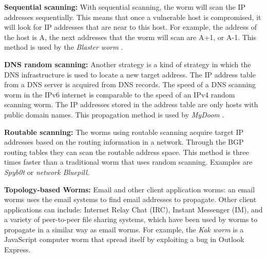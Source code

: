 \begin{description}
\item \textbf{Sequential scanning:}
With sequential scanning, the worm will scan the IP addresses sequentially. This means that once a vulnerable host is compromised, it will look for IP addresses that are near to this host. For example, the address of the host is A, the next addresses that the worm will scan are A+1, or A-1. This method is used by the \textit{Blaster worm} \citep{zou2006performance}.


\item \textbf{DNS random scanning:} Another strategy is a kind of strategy in which the DNS infrastructure is used to locate a new target address. The IP address table from a DNS server is acquired from DNS records. 
The speed of a DNS scanning worm in the IPv6 internet is comparable to the speed of an IPv4 random scanning worm. 
The IP addresses stored in the address table are only hosts with public domain names. This propagation method is used by \textit{MyDoom} \citep{kamra2005effect}.

\item \textbf{Routable scanning:} The worms using routable scanning acquire target IP addresses based on the routing information in a network. Through  the BGP routing tables they can scan the routable address space. This method is three times faster than a traditional worm that uses random scanning. Examples are \textit{Spyb0t} or \textit{network Bluepill}. 

\item \textbf{Topology-based Worms:} Email and other client application worms: an email worms uses the email systems to find email addresses to propagate. Other client applications can include: Internet Relay Chat (IRC), Instant Messenger (IM), and a variety of peer-to-peer
file sharing systems, which have been used by worms to propagate in a similar way as email worms. For example, the \textit{Kak worm} \citep{Kakworm} is a JavaScript computer worm that spread itself by exploiting a bug in Outlook Express. %


\end{description}
